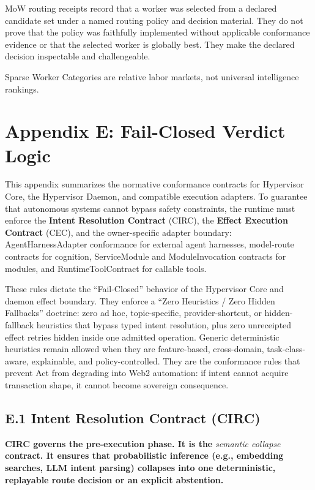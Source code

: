 \documentclass[
  11pt,
]{article}
\begin{document}
MoW routing receipts record that a worker was selected from a declared
candidate set under a named routing policy and decision material. They do not
prove that the policy was faithfully implemented without applicable
conformance evidence or that the selected worker is globally best. They make
the declared decision inspectable and challengeable.

Sparse Worker Categories are relative labor markets, not universal
intelligence rankings.

\hypertarget{appendix-e-fail-closed-verdict-logic}{%
\section{Appendix E: Fail-Closed Verdict
Logic}\label{appendix-e-fail-closed-verdict-logic}}

This appendix summarizes the normative conformance contracts for
Hypervisor Core, the Hypervisor Daemon, and compatible execution adapters. To
guarantee that autonomous systems cannot bypass safety constraints, the runtime
must enforce the \textbf{Intent Resolution Contract} (CIRC), the
\textbf{Effect Execution Contract} (CEC), and the owner-specific adapter
boundary: AgentHarnessAdapter conformance for external agent harnesses,
model-route contracts for cognition, ServiceModule and ModuleInvocation
contracts for modules, and RuntimeToolContract for callable tools.

These rules dictate the ``Fail-Closed'' behavior of the Hypervisor
Core and daemon effect boundary. They enforce a ``Zero Heuristics / Zero Hidden Fallbacks''
doctrine: zero ad hoc, topic-specific, provider-shortcut, or hidden-fallback
heuristics that bypass typed intent resolution, plus zero unreceipted effect
retries hidden inside one admitted operation. Generic deterministic
heuristics remain allowed when they are feature-based, cross-domain,
task-class-aware, explainable, and policy-controlled. They are the conformance
rules that prevent Act from degrading into Web2 automation: if intent
cannot acquire transaction shape, it cannot become sovereign
consequence.

\hypertarget{e.1-intent-resolution-contract-circ}{%
\subsection{E.1 Intent Resolution Contract
(CIRC)}\label{e.1-intent-resolution-contract-circ}}

\textbf{CIRC governs the pre-execution phase. It is the }\emph{semantic
collapse}\textbf{ contract. It ensures that probabilistic inference
(e.g., embedding searches, LLM intent parsing) collapses into one
deterministic, replayable route decision or an explicit abstention.}
\end{document}

